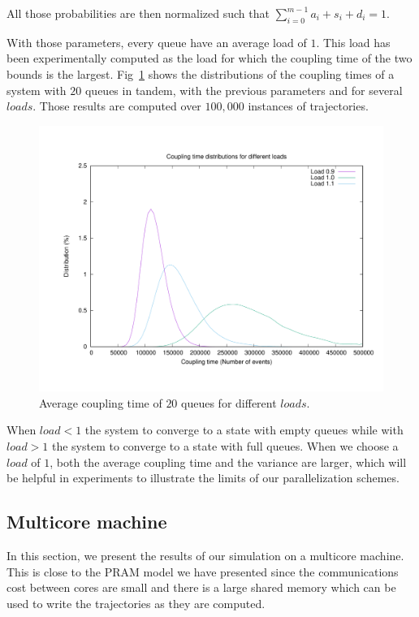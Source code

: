 \documentclass[a4paper,10pt]{article}
\begin{document}
All those probabilities are then normalized such that $\sum\limits_{i=0}^{m-1} a_i + s_i + d_i = 1$.

With those parameters, every queue have an average load of $1$. This load has been experimentally computed as the load for which the coupling time of the two bounds is the largest. Fig~\ref{fig:distribs} shows the distributions of the coupling times of a system with $20$ queues in tandem, with the previous parameters and for several $loads$. Those results are computed over $100,000$ instances of trajectories. 

\begin{figure}[!h]
\centering
 \includegraphics[scale=0.3]{distribs.pdf}
 \caption{Average coupling time of $20$ queues for different $loads$.}\label{fig:distribs}
\end{figure}
When $load < 1$ the system to converge to a state with empty queues while with $load > 1$ the system to converge to a state with full queues. When we choose a $load$ of $1$, both the average coupling time and the variance are larger, which will be helpful in experiments to illustrate the limits of our parallelization schemes.

\subsection{Multicore machine}

In this section, we present the results of our simulation on a multicore machine.
This is close to the PRAM model we have presented since the communications cost between cores
are small and there is a large shared memory which can be used to write the trajectories as they are computed.
\end{document}
